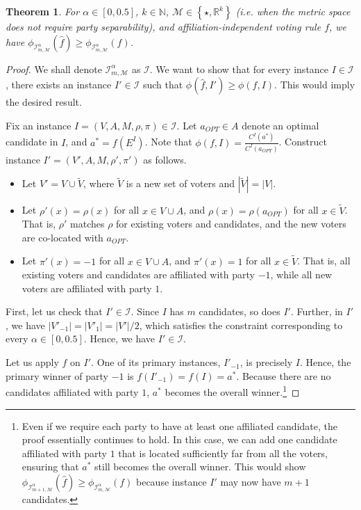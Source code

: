 \documentclass[letterpaper]{article} %
\newtheorem{theorem}{Theorem}
\theoremstyle{definition}
\newcommand{\set}[1]{\left\{#1\right\}}
\renewcommand{\hat}{\widehat}
\renewcommand{\tilde}{\widetilde}
\newcommand{\bbN}{\mathbb{N}}
\newcommand{\bbR}{\mathbb{R}}
\newcommand{\calI}{\mathcal{I}}
\newcommand{\calM}{\mathcal{M}}
\newcommand{\pleft}{-1}
\newcommand{\pright}{1}
\newcommand{\I}{\calI}
\begin{document}
\begin{theorem}
\label{thm:large-primaries-not-better-all}
	For $\alpha \in [0,0.5]$, $k \in \bbN$, $\calM \in \set{\star,\bbR^k}$ (i.e. when the metric space does not require party separability), and affiliation-independent voting rule $f$, we have $\phi_{\I^{\alpha}_{m,\calM}}(\hat{f}) \ge \phi_{\I^{\alpha}_{m,\calM}}(f)$.
\end{theorem}
\begin{proof}
We shall denote $\I^{\alpha}_{m,\calM}$ as $\I$. We want to show that for every instance $I \in \I$, there exists an instance $I' \in \I$ such that $\phi(\hat{f},I') \ge \phi(f,I)$. This would imply the desired result.

	Fix an instance $I = (V,A,M,\rho,\pi) \in \I$. Let $a_{OPT} \in A$ denote an optimal candidate in $I$, and $a^* = f(E^I)$. Note that $\phi(f,I) = \frac{C^I(a^*)}{C^I(a_{OPT})}$. Construct instance $I' = (V',A,M,\rho',\pi')$ as follows.
	\begin{itemize}
		\item Let $V' = V \cup \tilde{V}$, where $\tilde{V}$ is a new set of voters and $|\tilde{V}| = |V|$.

		\item Let $\rho'(x) = \rho(x)$ for all $x \in V \cup A$, and $\rho(x) = \rho(a_{OPT})$ for all $x \in \tilde{V}$. That is, $\rho'$ matches $\rho$ for existing voters and candidates, and the new voters are co-located with $a_{OPT}$.

		\item Let $\pi'(x) = \pleft$ for all $x \in V \cup A$, and $\pi'(x) = \pright$ for all $x \in \tilde{V}$. That is, all existing voters and candidates are affiliated with party $\pleft$, while all new voters are affiliated with party $\pright$.
	\end{itemize}

	First, let us check that $I' \in \I$. Since $I$ has $m$ candidates, so does $I'$. Further, in $I'$, we have $|V'_{\pleft}| = |V'_{\pright}| = |V'|/2$, which satisfies the constraint corresponding to every $\alpha \in [0,0.5]$. Hence, we have $I' \in \I$.

	Let us apply $\hat{f}$ on $I'$. One of its primary instances, $I'_{\pleft}$, is precisely $I$. Hence, the primary winner of party $\pleft$ is $f(I'_{\pleft}) = f(I) = a^*$. Because there are no candidates affiliated with party $\pright$, $a^*$ becomes the overall winner.\footnote{Even if we require each party to have at least one affiliated candidate, the proof essentially continues to hold. In this case, we can add one candidate affiliated with party $\pright$ that is located sufficiently far from all the voters, ensuring that $a^*$ still becomes the overall winner. This would show $\phi_{\I^{\alpha}_{m+1,\calM}}(\hat{f}) \ge \phi_{\I^{\alpha}_{m,\calM}}(f)$ because instance $I'$ may now have $m+1$ candidates.}


\end{proof}
\end{document}
